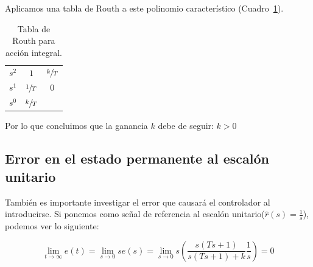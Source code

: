            Aplicamos una tabla de Routh a este polinomio característico (Cuadro~\ref{tab:AccionIntegral}).

            \begin{table}[htbp]
                \centering
                \begin{tabular}{c|c c}
                $s^2$ & $1$ & $\sfrac{k}{T}$ \\
                $s^1$ & $\sfrac{1}{T}$ & $0$ \\
                $s^0$ & $\sfrac{k}{T}$
                \end{tabular}
                \caption{\label{tab:AccionIntegral}Tabla de Routh para acción integral.}
            \end{table}

            Por lo que concluimos que la ganancia $k$ debe de seguir: $k>0$


        \subsection{Error en el estado permanente al escalón unitario}
            También es importante investigar el error que causará el controlador al introducirse. Si ponemos como señal de referencia al escalón unitario($\hat{r}(s) = \frac{1}{s}$), podemos ver lo siguiente:

            \begin{equation*}
                \displaystyle \lim_{t \to \infty} e(t) = \lim_{s \to 0} s e(s) = \lim_{s \to 0} s \left(\frac{s(Ts + 1)}{s(Ts + 1) + k} \frac{1}{s}\right) = 0
            \end{equation*}

